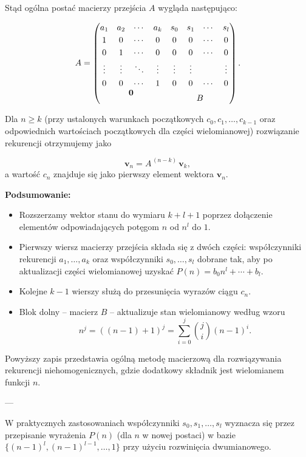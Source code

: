 \documentclass[12pt]{article}
\begin{document}
Stąd ogólna postać macierzy przejścia \(A\) wygląda następująco:

\[
A = \begin{pmatrix}
a_1 & a_2 & \cdots & a_k & s_0 & s_1 & \cdots & s_l \\[1mm]
1   & 0   & \cdots & 0   & 0   & 0   & \cdots & 0 \\[1mm]
0   & 1   & \cdots & 0   & 0   & 0   & \cdots & 0 \\[1mm]
\vdots & \vdots & \ddots & \vdots & \vdots & \vdots &  & \vdots \\[1mm]
0   & 0   & \cdots & 1   & 0   & 0   & \cdots & 0 \\[2mm]
\multicolumn{4}{c}{\raisebox{1.5ex}[0pt]{\(\mathbf{0}\)}} & \multicolumn{4}{c}{B}
\end{pmatrix}.
\]

Dla \( n\geq k \) (przy ustalonych warunkach początkowych \(c_0, c_1, \dots, c_{k-1}\) oraz odpowiednich wartościach początkowych dla części wielomianowej) rozwiązanie rekurencji otrzymujemy jako

\[
\mathbf{v}_n = A^{\, (n-k)}\,\mathbf{v}_k,
\]
a wartość \( c_n \) znajduje się jako pierwszy element wektora \(\mathbf{v}_n\).

\bigskip

\textbf{Podsumowanie:}
\begin{itemize}
    \item Rozszerzamy wektor stanu do wymiaru \(k+l+1\) poprzez dołączenie elementów odpowiadających potęgom \(n\) od \(n^l\) do \(1\).
    \item Pierwszy wiersz macierzy przejścia składa się z dwóch części: współczynniki rekurencji \(a_1,\dots,a_k\) oraz współczynniki \(s_0,\dots,s_l\) dobrane tak, aby po aktualizacji części wielomianowej uzyskać \(P(n) = b_0 n^l + \cdots + b_l\).
    \item Kolejne \(k-1\) wierszy służą do przesunięcia wyrazów ciągu \(c_n\).
    \item Blok dolny – macierz \(B\) – aktualizuje stan wielomianowy według wzoru
    \[
    n^j = ((n-1)+1)^j = \sum_{i=0}^{j} \binom{j}{i}(n-1)^i.
    \]
\end{itemize}

Powyższy zapis przedstawia ogólną metodę macierzową dla rozwiązywania rekurencji niehomogenicznych, gdzie dodatkowy składnik jest wielomianem funkcji \(n\).

---

W praktycznych zastosowaniach współczynniki \(s_0, s_1, \dots, s_l\) wyznacza się przez przepisanie wyrażenia \(P(n)\) (dla \(n\) w nowej postaci) w bazie \(\{(n-1)^l,(n-1)^{l-1},\dots,1\}\) przy użyciu rozwinięcia dwumianowego.
\newpage
\end{document}
